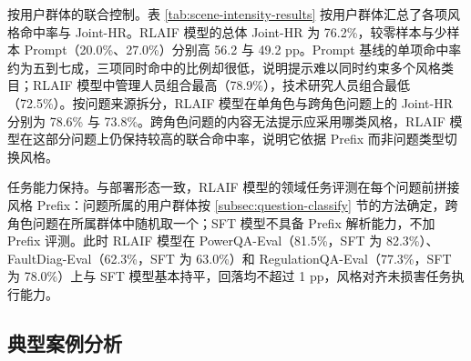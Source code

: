 \documentclass[fontset=fandol,type=master,campus=shenzhen,etitleauto=true]{hithesisbook}
\begin{document}
按用户群体的联合控制。表 \ref{tab:scene-intensity-results} 按用户群体汇总了各项风格命中率与 Joint-HR。RLAIF 模型的总体 Joint-HR 为 76.2\%，较零样本与少样本 Prompt（20.0\%、27.0\%）分别高 56.2 与 49.2 pp。Prompt 基线的单项命中率约为五到七成，三项同时命中的比例却很低，说明提示难以同时约束多个风格类目；RLAIF 模型中管理人员组合最高（78.9\%），技术研究人员组合最低（72.5\%）。按问题来源拆分，RLAIF 模型在单角色与跨角色问题上的 Joint-HR 分别为 78.6\% 与 73.8\%。跨角色问题的内容无法提示应采用哪类风格，RLAIF 模型在这部分问题上仍保持较高的联合命中率，说明它依据 Prefix 而非问题类型切换风格。

\begin{table}[htbp]
\centering
\caption{三类用户群体组合下的各项风格命中率与联合命中率（单位：\%）}
\label{tab:scene-intensity-results}
\small
\setlength{\tabcolsep}{6pt}
\renewcommand{\arraystretch}{1.15}
\end{table}

任务能力保持。与部署形态一致，RLAIF 模型的领域任务评测在每个问题前拼接风格 Prefix：问题所属的用户群体按 \ref{subsec:question-classify} 节的方法确定，跨角色问题在所属群体中随机取一个；SFT 模型不具备 Prefix 解析能力，不加 Prefix 评测。此时 RLAIF 模型在 PowerQA-Eval（81.5\%，SFT 为 82.3\%）、FaultDiag-Eval（62.3\%，SFT 为 63.0\%）和 RegulationQA-Eval（77.3\%，SFT 为 78.0\%）上与 SFT 模型基本持平，回落均不超过 1 pp，风格对齐未损害任务执行能力。

\subsection{典型案例分析}\label{subsec:style-case}
\end{document}
